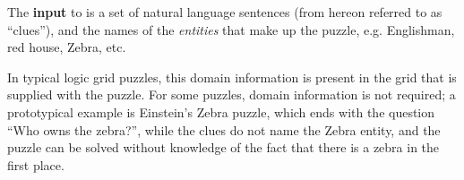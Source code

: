  

The \textbf{input} to \ourtool is a set of natural language sentences (from hereon referred to as ``clues''), and the names of the \textit{entities} that make up the puzzle, e.g. Englishman, red house, Zebra, etc. 

In typical logic grid puzzles, this domain information is present in the grid that is supplied with the puzzle. For some puzzles, domain information is not required; a prototypical example is Einstein's Zebra puzzle, which ends with the question ``Who owns the zebra?'', while the clues do not name the Zebra entity, and the puzzle can be solved without knowledge of the fact that there is a zebra in the first place. 

%




